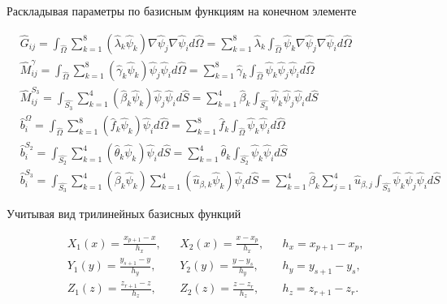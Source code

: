 \documentclass[12pt]{article}
\begin{document}
\vskip 5mm
\noindent Раскладывая параметры по базисным функциям на конечном элементе

\begin{align}
  &\hat{G}_{ij} = \int_{\hat{\Omega}}
    \sum_{k=1}^{8}(\hat{\lambda}_{k}\hat{\psi}_k)
    \nabla\hat{\psi}_j
    \nabla\hat{\psi}_i d\hat{\Omega} 
  = \sum_{k=1}^{8}\hat{\lambda}_{k}\int_{\hat{\Omega}}
    \hat{\psi}_k
    \nabla\hat{\psi}_j
    \nabla\hat{\psi}_i d\hat{\Omega} \\
  &\hat{M}^{\gamma}_{ij} = \int_{\hat{\Omega}}
    \sum_{k=1}^{8}(\hat{\gamma}_{k}\hat{\psi}_k)
    \hat{\psi}_j
    \hat{\psi}_i d\hat{\Omega} 
  = \sum_{k=1}^{8}\hat{\gamma}_{k}\int_{\hat{\Omega}}
    \hat{\psi}_k
    \hat{\psi}_j
    \hat{\psi}_i d\hat{\Omega} \\
  &\hat{M}^{S_3}_{ij} = \int_{\hat{S_3}}
    \sum_{k=1}^{4}(\hat{\beta}_{k}\hat{\psi}_k)
    \hat{\psi}_j
    \hat{\psi}_i d\hat{S}
  = \sum_{k=1}^{4}\hat{\beta}_{k}\int_{\hat{S_3}}
    \hat{\psi}_k
    \hat{\psi}_j
    \hat{\psi}_i d\hat{S} \\
  &\hat{b}^{\Omega}_{i} = \int_{\hat{\Omega}}
    \sum_{k=1}^{8}(\hat{f}_{k}\hat{\psi}_k)
    \hat{\psi}_i d\hat{\Omega} 
  = \sum_{k=1}^{8}\hat{f}_{k}\int_{\hat{\Omega}}
    \hat{\psi}_k
    \hat{\psi}_i d\hat{\Omega} \\
  &\hat{b}^{S_2}_{i} = \int_{\hat{S_2}}
    \sum_{k=1}^{4}(\hat{\theta}_{k}\hat{\psi}_k)
    \hat{\psi}_i d\hat{S} 
  = \sum_{k=1}^{4}\hat{\theta}_{k}\int_{\hat{S_2}}
    \hat{\psi}_k
    \hat{\psi}_i d\hat{S} \\
  &\hat{b}^{S_3}_{i} = \int_{\hat{S_3}}
    \sum_{k=1}^{4}(\hat{\beta}_{k}\hat{\psi}_k)
    \sum_{k=1}^{4}(\hat{u}_{\beta, k}\hat{\psi}_k)
    \hat{\psi}_i d\hat{S}
  = \sum_{k=1}^{4}\hat{\beta}_{k}\sum_{j=1}^{4}
    \hat{u}_{\beta, j}
    \int_{\hat{S_3}}\hat{\psi}_k\hat{\psi}_j\hat{\psi}_i d\hat{S}
\end{align}

\vskip 5mm
\noindent Учитывая вид трилинейных базисных функций

\begin{align*}
  & X_1(x) = \frac{x_{p+1}-x}{h_x}, & &X_2(x) = \frac{x - x_{p}}{h_x}, & &h_x = x_{p+1} - x_p, \\
  & Y_1(y) = \frac{y_{s+1}-y}{h_y}, & &Y_2(y) = \frac{y - y_{s}}{h_y}, & &h_y = y_{s+1} - y_s, \\
  & Z_1(z) = \frac{z_{r+1}-z}{h_z}, & &Z_2(z) = \frac{z - z_{r}}{h_z}, & &h_z = z_{r+1} - z_r.
\end{align*}
\end{document}
